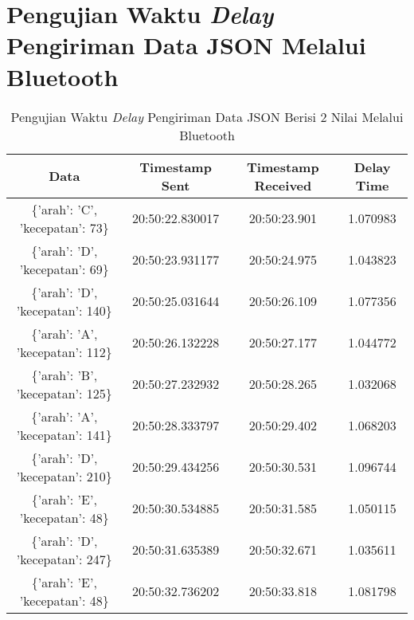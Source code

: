 \section{Pengujian Waktu \emph{Delay} Pengiriman Data JSON Melalui Bluetooth}
\label{sec:delayBluetoothJSON}

\begin{longtable}{|ccc|c|}
  \caption{Pengujian Waktu \emph{Delay} Pengiriman Data JSON Berisi 2 Nilai Melalui Bluetooth}
  \label{tbl:delayBluetoothJSON2}\\
    \hline
    \multicolumn{1}{|c|}{Data}                              & \multicolumn{1}{c|}{Timestamp Sent}  & Timestamp Received & Delay Time  \\ \hline
    \endfirsthead
    \endhead
    \multicolumn{1}{|c|}{\{'arah': 'C', 'kecepatan': 73\}}  & \multicolumn{1}{c|}{20:50:22.830017} & 20:50:23.901       & 1.070983    \\ \hline
    \multicolumn{1}{|c|}{\{'arah': 'D', 'kecepatan': 69\}}  & \multicolumn{1}{c|}{20:50:23.931177} & 20:50:24.975       & 1.043823    \\ \hline
    \multicolumn{1}{|c|}{\{'arah': 'D', 'kecepatan': 140\}} & \multicolumn{1}{c|}{20:50:25.031644} & 20:50:26.109       & 1.077356    \\ \hline
    \multicolumn{1}{|c|}{\{'arah': 'A', 'kecepatan': 112\}} & \multicolumn{1}{c|}{20:50:26.132228} & 20:50:27.177       & 1.044772    \\ \hline
    \multicolumn{1}{|c|}{\{'arah': 'B', 'kecepatan': 125\}} & \multicolumn{1}{c|}{20:50:27.232932} & 20:50:28.265       & 1.032068    \\ \hline
    \multicolumn{1}{|c|}{\{'arah': 'A', 'kecepatan': 141\}} & \multicolumn{1}{c|}{20:50:28.333797} & 20:50:29.402       & 1.068203    \\ \hline
    \multicolumn{1}{|c|}{\{'arah': 'D', 'kecepatan': 210\}} & \multicolumn{1}{c|}{20:50:29.434256} & 20:50:30.531       & 1.096744    \\ \hline
    \multicolumn{1}{|c|}{\{'arah': 'E', 'kecepatan': 48\}}  & \multicolumn{1}{c|}{20:50:30.534885} & 20:50:31.585       & 1.050115    \\ \hline
    \multicolumn{1}{|c|}{\{'arah': 'D', 'kecepatan': 247\}} & \multicolumn{1}{c|}{20:50:31.635389} & 20:50:32.671       & 1.035611    \\ \hline
    \multicolumn{1}{|c|}{\{'arah': 'E', 'kecepatan': 48\}}  & \multicolumn{1}{c|}{20:50:32.736202} & 20:50:33.818       & 1.081798    \\ \hline

\end{longtable}
